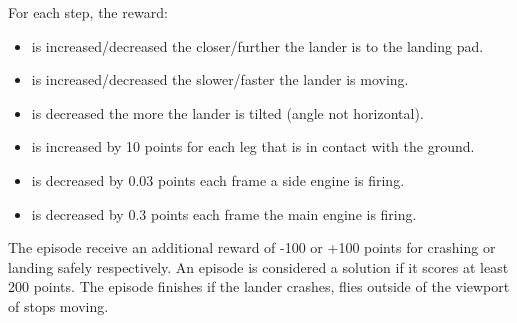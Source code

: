 \documentclass{article}
\begin{document}
For each step, the reward:
\begin{itemize}
  \item is increased/decreased the closer/further the lander is to the landing pad.
  \item is increased/decreased the slower/faster the lander is moving.
  \item is decreased the more the lander is tilted (angle not horizontal).
  \item is increased by 10 points for each leg that is in contact with the ground.
  \item is decreased by 0.03 points each frame a side engine is firing.
  \item is decreased by 0.3 points each frame the main engine is firing.
\end{itemize}

The episode receive an additional reward of -100 or +100 points for crashing or landing safely respectively. An episode is considered a solution if it scores at least 200 points. The episode finishes if the lander crashes, flies outside of the viewport of stops moving.
\end{document}
